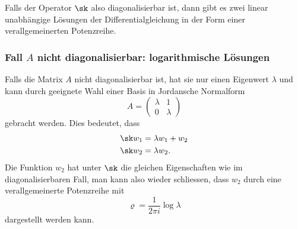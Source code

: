 Falls der Operator $\sk$ also diagonalisierbar ist, dann gibt es
zwei linear unabhängige Lösungen der Differentialgleichung in der
Form einer verallgemeinerten Potenzreihe.

%
%
\subsubsection{Fall $A$ nicht diagonalisierbar: logarithmische Lösungen}
Falls die Matrix $A$ nicht diagonalisierbar ist, hat sie nur einen
Eigenwert $\lambda$ und kann durch geeignete Wahl einer Basis in
Jordansche Normalform
\[
A
=
\begin{pmatrix}
\lambda &    1    \\
   0    & \lambda
\end{pmatrix}
\]
gebracht werden.
Dies bedeutet, dass
\begin{align*}
\sk w_1 &= \lambda w_1 + w_2
\\
\sk w_2 &= \lambda w_2.
\end{align*}
Die Funktion $w_2$ hat unter $\sk$ die gleichen Eigenschaften
wie im diagonalisierbaren Fall, man kann also wieder schliessen,
dass $w_2$ durch eine verallgemeinerte Potenzreihe mit
\[
\varrho=\frac{1}{2\pi i} \log \lambda
\]
dargestellt werden kann.

